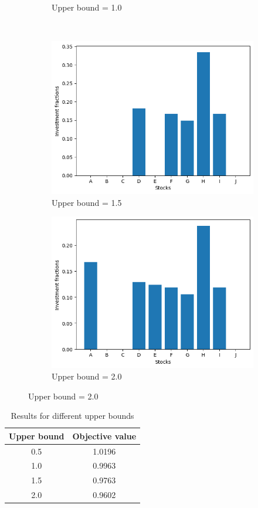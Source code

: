 \begin{figure}[H]
\begin{subfigure}{0.5\textwidth}
        \caption{Upper bound = 1.0}
    \end{subfigure}\\
    \begin{subfigure}{0.5\textwidth}
        \includegraphics[width=\textwidth]{lab12/imgs/norm_15.png}
        \caption{Upper bound = 1.5}
    \end{subfigure}
    \begin{subfigure}{0.5\textwidth}
        \includegraphics[width=\textwidth]{lab12/imgs/norm_20.png}
        \caption{Upper bound = 2.0}
    \end{subfigure}
    \label{fig:norm}
\end{figure}

\begin{table}[H]
    \centering
    \begin{tabular}{|c|c|}
        Upper bound & Objective value \\ \hline
        0.5         & 1.0196          \\
        1.0         & 0.9963          \\
        1.5         & 0.9763          \\
        2.0         & 0.9602          \\
        \hline
    \end{tabular}
    \caption{Results for different upper bounds}
\end{table}